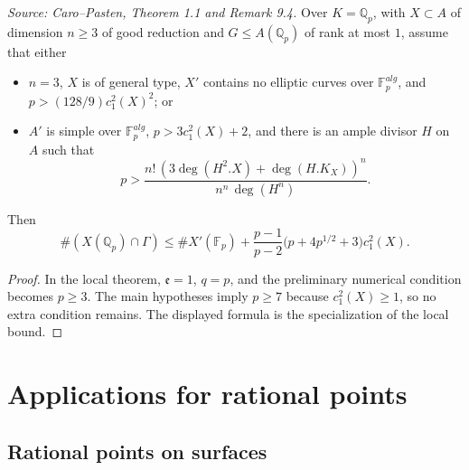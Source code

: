 \begin{theorem}
  \label{thm:cp_main_qp}
  \textit{Source: Caro--Pasten, Theorem 1.1 and Remark 9.4.}
  Over \(K=\mathbb Q_p\), with \(X\subset A\) of dimension \(n\ge3\) of good
  reduction and \(G\le A(\mathbb Q_p)\) of rank at most \(1\), assume that
  either
  \begin{itemize}
    \item[(i)] \(n=3\), \(X\) is of general type, \(X'\) contains no elliptic
      curves over \(\mathbb F_p^{alg}\), and \(p>(128/9)c_1^2(X)^2\); or
    \item[(ii)] \(A'\) is simple over \(\mathbb F_p^{alg}\),
      \(p>3c_1^2(X)+2\), and there is an ample divisor \(H\) on \(A\) such that
      \[
        p>\frac{n!\,(3\deg(H^2.X)+\deg(H.K_X))^n}{n^n\,\deg(H^n)}.
      \]
  \end{itemize}
  Then
  \[
    \#(X(\mathbb Q_p)\cap\Gamma)
    \le \#X'(\mathbb F_p)+
    \frac{p-1}{p-2}\bigl(p+4p^{1/2}+3\bigr)c_1^2(X).
  \]
\end{theorem}
\begin{proof}
  In the local theorem, \(\mathfrak e=1\), \(q=p\), and the preliminary
  numerical condition becomes \(p\ge3\).  The main hypotheses imply
  \(p\ge7\) because \(c_1^2(X)\ge1\), so no extra condition remains.  The
  displayed formula is the specialization of the local bound.
\end{proof}

\section{Applications for rational points}

\subsection{Rational points on surfaces}

